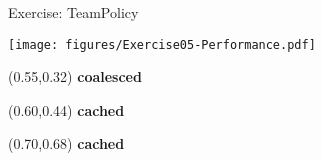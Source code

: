 
\begin{frame}[fragile]{Exercise: TeamPolicy}

  \vspace{-10pt}

  \begin{center}
    \texttt{[image: figures/Exercise05-Performance.pdf]}
  \end{center}

  \vspace{-15pt}

  \begin{textblock*}{0.5\textwidth}(0.55\textwidth,0.32\textheight)
    \textbf{coalesced}
  \end{textblock*}

  \begin{textblock*}{0.5\textwidth}(0.60\textwidth,0.44\textheight)
    \textbf{cached}
  \end{textblock*}

  \begin{textblock*}{0.5\textwidth}(0.70\textwidth,0.68\textheight)
    \textbf{cached}
  \end{textblock*}

\end{frame}


